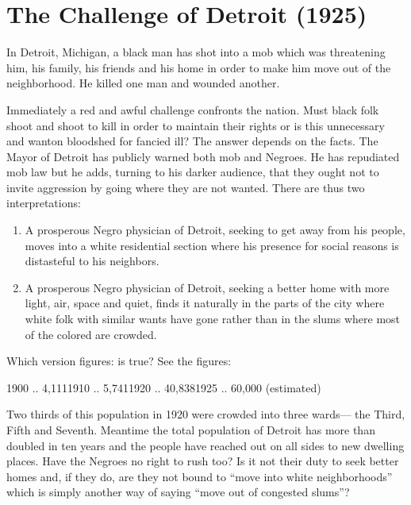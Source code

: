 \documentclass[letterpaper,10pt,english]{jupyterBook}
\begin{document}
\section{The Challenge of Detroit (1925)}
\label{\detokenize{Volumes/31/01/challenge_of_detroit:the-challenge-of-detroit-1925}}\label{\detokenize{Volumes/31/01/challenge_of_detroit::doc}}
\sphinxAtStartPar
In Detroit, Michigan, a black man has shot into a mob which was threatening him, his family, his friends and his home in order to make him move out of the neighborhood. He killed one man and wounded another.



\sphinxAtStartPar
Immediately a red and awful challenge confronts the nation. Must black folk shoot and shoot to kill in order to maintain their rights or is this unnecessary and wanton bloodshed for fancied ill? The answer depends on the facts. The Mayor of Detroit has publicly warned both mob and Negroes. He has repudiated mob law but he adds, turning to his darker audience, that they ought not to invite aggression by going where they are not wanted. There are thus two interpretations:
\begin{enumerate}
%
\item {} 
\sphinxAtStartPar
A prosperous Negro physician of Detroit, seeking to get away from his people, moves into a white residential section where his presence for social reasons is distasteful to his neighbors.

\item {} 
\sphinxAtStartPar
A prosperous Negro physician of Detroit, seeking a better home with more light, air, space and quiet, finds it naturally in the parts of the city where white folk with similar wants have gone rather than in the slums where most of the colored are crowded.

\end{enumerate}

\sphinxAtStartPar
Which version figures: is true? See the figures:

\sphinxAtStartPar
{}

\sphinxAtStartPar
{}1900 .. 4,1111910 .. 5,7411920 .. 40,8381925 .. 60,000 (estimated)

\sphinxAtStartPar
Two thirds of this population in 1920 were crowded into three wards— the Third, Fifth and Seventh. Meantime the total population of Detroit has more than doubled in ten years and the people have reached out on all sides to new dwelling places. Have the Negroes no right to rush too? Is it not their duty to seek better homes and, if they do, are they not bound to “move into white neighborhoods” which is simply another way of saying “move out of congested slums”?
\end{document}
